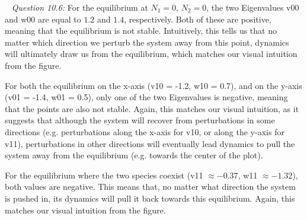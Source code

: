 \documentclass[12pt]{article}
\begin{document}
~\newline
\textit{Question 10.6:}
\newline
For the equilibrium at $N_1 = 0$, $N_2 = 0$, the two Eigenvalues v00 and w00 are equal to $1.2$ and $1.4$, respectively. Both of these are positive, meaning that the equilibrium is not stable. Intuitively, this tells us that no matter which direction we perturb the system away from this point, dynamics will ultimately draw us from the equilibrium, which matches our visual intuition from the figure.

For both the equilibrium on the x-axis (v10 = -1.2, w10 = 0.7), and on the y-axis (v01 = -1.4, w01 = 0.5), only one of the two Eigenvalues is negative, meaning that the points are also not stable. Again, this matches our visual intuition, as it suggests that although the system will recover from perturbations in some directions (e.g. perturbations along the x-axis for v10, or along the y-axis for v11), perturbations in other directions will eventually lead dynamics to pull the system away from the equilibrium (e.g. towards the center of the plot).

For the equilibrium where the two species coexist (v11 $\approx -0.37$, w11 $\approx -1.32$), both values are negative. This means that, no matter what direction the system is pushed in, its dynamics will pull it back towards this equilibrium. Again, this matches our visual intuition from the figure.

~\newline
\end{document}
